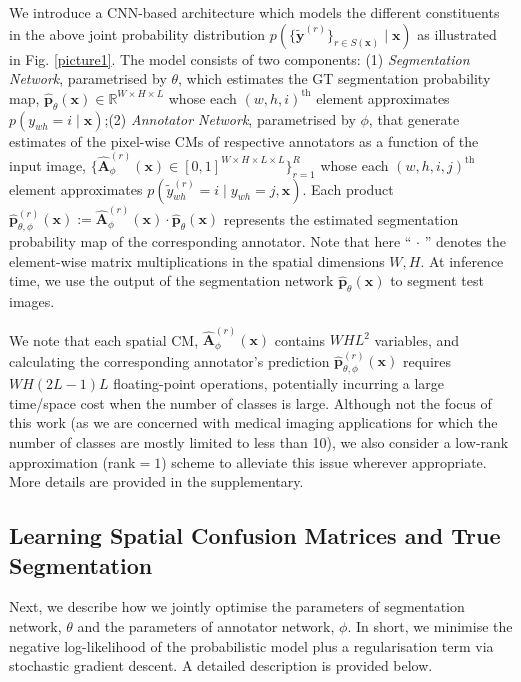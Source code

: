 We introduce a CNN-based architecture which models the different constituents in the above joint probability distribution $p(\{\tilde{\textbf{y}}^{(r)}\}_{r\in S(\mathbf{x})}\mid \textbf{x})$ as illustrated in Fig. \ref{picture1}. The model consists of two components: (1) \textit{Segmentation Network}, parametrised by $\theta$, which estimates the GT segmentation probability map, $\hat{\textbf{p}}_{\theta}(\textbf{x}) \in \mathbb{R}^{W\times H \times L}$ whose each $(w, h, i)^\text{th}$ element approximates $p(y_{wh}=i\mid \textbf{x})$;(2) \textit{Annotator Network}, parametrised by $\phi$, that generate estimates of the pixel-wise CMs of respective annotators as a function of the input image, $\{\hat{\textbf{A}}_{\phi}^{(r)}(\textbf{x})\in [0,1]^{W\times H\times L \times L}\}_{r=1}^{R}$ whose each $(w, h, i, j)^\text{th}$ element approximates $p(\tilde{y}^{(r)}_{wh}=i\mid y_{wh}=j,\textbf{x})$. Each product ${\hat{\textbf{p}}_{\theta, \phi}^{(r)}}(\textbf{x}):=\hat{\textbf{A}}_{\phi}^{(r)}(\textbf{x})\cdot \hat{\textbf{p}}_\theta (\textbf{x})$ represents the estimated segmentation probability map of the corresponding annotator. Note that here ``$\,\cdot\,$'' denotes the element-wise matrix multiplications in the spatial dimensions $W, H$. At inference time, we use the output of the segmentation network ${\hat{\textbf{p}}_\theta }(\textbf{x})$ to segment test images. 

We note that each spatial CM, $\hat{\textbf{A}}_{\phi}^{(r)}(\textbf{x})$ contains $WHL^2$ variables, 
and calculating the corresponding annotator's prediction $\hat{\textbf{p}}_{\theta, \phi}^{(r)}(\textbf{x})$ requires $WH(2L-1)L$ floating-point operations, potentially incurring a large time/space cost when the number of classes is large. Although not the focus of this work (as we are concerned with medical imaging applications for which the number of classes are mostly limited to less than 10), we also consider a low-rank approximation (rank$=1$) scheme to alleviate this issue wherever appropriate. More details are provided in the supplementary.

\subsection{Learning Spatial Confusion Matrices and True Segmentation}

Next, we describe how we jointly optimise the parameters of segmentation network, $\theta$ and the parameters of annotator network, $\phi$. In short, we minimise the negative log-likelihood of the probabilistic model plus a regularisation term via stochastic gradient descent. A detailed description is provided below. 

